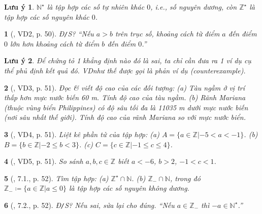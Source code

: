 \documentclass{article}
\newtheorem{baitoan}{}
\newtheorem{luuy}{Lưu ý}
\begin{document}
\begin{luuy}
	$\mathbb{N}^\star$ là tập hợp các số tự nhiên khác $0$, i.e., số nguyên dương, còn $\mathbb{Z}^\star$ là tập hợp các số nguyên khác $0$.
\end{luuy}

\begin{baitoan}[\cite{Binh_boi_duong_Toan_6_tap_1}, VD2, p. 50]
	{\rm Đ{\tt/}S?} ``Nếu $a > b$ trên trục số, khoảng cách từ điểm $a$ đến điểm $0$ lớn hơn khoảng cách từ điểm $b$ đến điểm $0$.''
\end{baitoan}

\begin{luuy}
	Để chứng tỏ 1 khẳng định nào đó là sai, ta chỉ cần đưa ra 1 ví dụ cụ thể phủ định kết quả đó. VDnhư thế được gọi là {\rm phản ví dụ (counterexample)}.
\end{luuy}

\begin{baitoan}[\cite{Binh_boi_duong_Toan_6_tap_1}, VD3, p. 51]
	Đọc \& viết độ cao của các đối tượng: (a) Tàu ngầm ở vị trí thấp hơn mực nước biến {\rm60 m}. Tính độ cao của tàu ngầm. (b) Rãnh Mariana (thuộc vùng biển Philippines) có độ sâu tối đa là {\rm11035 m} dưới mực nước biến (nơi sâu nhất thế giới). Tính độ cao của rãnh Mariana so với mực nước biển.
\end{baitoan}

\begin{baitoan}[\cite{Binh_boi_duong_Toan_6_tap_1}, VD4, p. 51]
	Liệt kê phần tử của tập hợp: (a) $A = \{a\in\mathbb{Z}|-5 < a < -1\}$. (b) $B = \{b\in\mathbb{Z}|-2\le b < 3\}$. (c) $C = \{c\in\mathbb{Z}|-1\le c\le4\}$.
\end{baitoan}

\begin{baitoan}[\cite{Binh_boi_duong_Toan_6_tap_1}, VD5, p. 51]
	So sánh $a,b,c\in\mathbb{Z}$ biết $a < -6$, $b > 2$, $-1 < c < 1$.
\end{baitoan}

\begin{baitoan}[\cite{Binh_boi_duong_Toan_6_tap_1}, 7.1., p. 52]
	Tìm tập hợp: (a) $\mathbb{Z}^\star\cap\mathbb{N}$. (b) $\mathbb{Z}_-\cap\mathbb{N}$, trong đó $\mathbb{Z}_-\coloneqq\{a\in\mathbb{Z}|a\le0\}$ là tập hợp các số nguyên không dương.
\end{baitoan}

\begin{baitoan}[\cite{Binh_boi_duong_Toan_6_tap_1}, 7.2., p. 52]
	{\rm Đ{\tt/}S?} Nếu sai, sửa lại cho đúng. ``Nếu $a\in\mathbb{Z}_-$ thì $-a\in\mathbb{N}^\star$.''
\end{baitoan}
\end{document}
